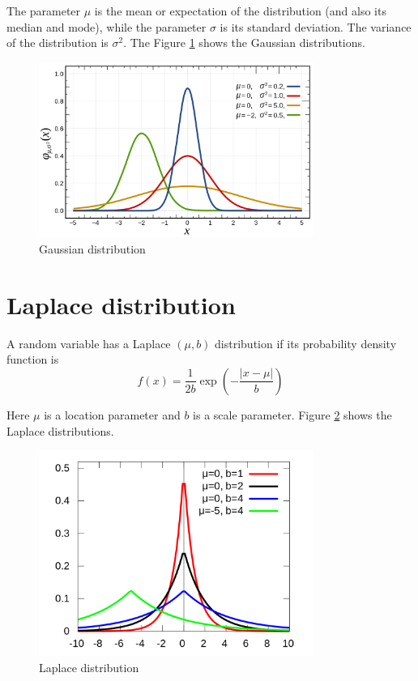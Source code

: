 The parameter $\mu$ is the mean or expectation of the distribution (and also its median and mode), while the parameter $\sigma$ is its standard deviation.
The variance of the distribution is $\sigma^2$.
The Figure \ref{fig:gaussian-distribution} shows the Gaussian distributions.

\begin{figure}[!htp]
  \centering
  \includegraphics[width=0.8\textwidth]{images/gaussian-distribution}
  \caption{Gaussian distribution}
  \label{fig:gaussian-distribution}
\end{figure}
\section{Laplace distribution}
\label{sec:laplace-distribution}

A random variable has a Laplace $(\mu, b)$ distribution if its probability density function is
\begin{equation}
  \label{eq:23}
  f(x)=\frac{1}{2 b} \exp \left(-\frac{|x-\mu|}{b}\right)  
\end{equation}

Here \(\mu\) is a location parameter and \(b\) is a scale parameter.
Figure \ref{fig:laplace-distribution} shows the Laplace distributions.

\begin{figure}[!htp]
  \centering
  \includegraphics[width=0.8\textwidth]{images/laplace-distribution}
  \caption{Laplace distribution}
  \label{fig:laplace-distribution}
\end{figure}

